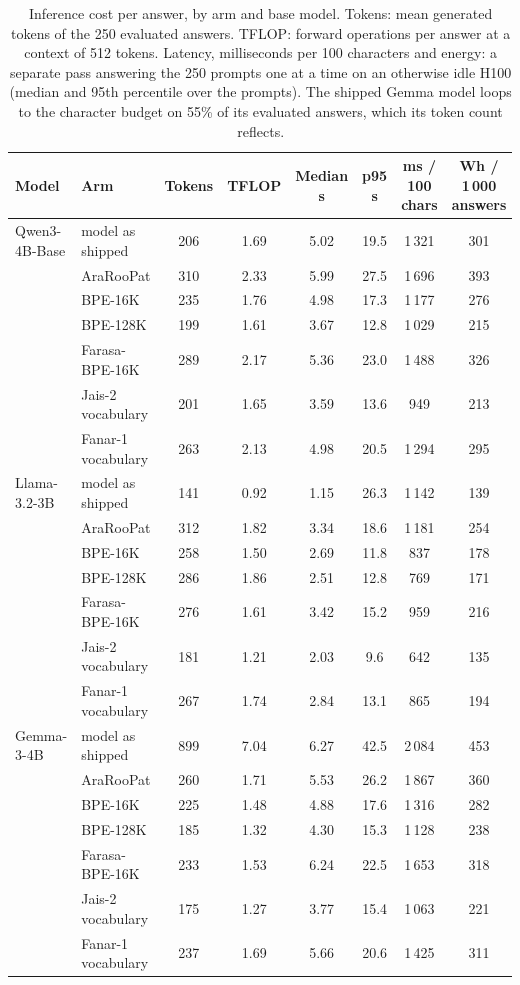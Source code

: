 \documentclass[a4paper,fleqn]{cas-sc}
\begin{document}
\begin{table}[t]
\centering
\caption{Inference cost per answer, by arm and base model. Tokens: mean generated tokens of the 250 evaluated answers. TFLOP: forward operations per answer at a context of 512 tokens. Latency, milliseconds per 100 characters and energy: a separate pass answering the 250 prompts one at a time on an otherwise idle H100 (median and 95th percentile over the prompts). The shipped Gemma model loops to the character budget on 55\% of its evaluated answers, which its token count reflects.}
\label{tab:cost}
\small
\begin{tabular}{@{}llcccccc@{}}
\toprule
Model & Arm & Tokens & TFLOP & Median s & p95 s & ms / 100 chars & Wh / 1\,000 answers \\
\midrule
Qwen3-4B-Base & model as shipped & 206 & 1.69 & 5.02 & 19.5 & 1\,321 & 301 \\
 & AraRooPat & 310 & 2.33 & 5.99 & 27.5 & 1\,696 & 393 \\
 & BPE-16K & 235 & 1.76 & 4.98 & 17.3 & 1\,177 & 276 \\
 & BPE-128K & 199 & 1.61 & 3.67 & 12.8 & 1\,029 & 215 \\
 & Farasa-BPE-16K & 289 & 2.17 & 5.36 & 23.0 & 1\,488 & 326 \\
 & Jais-2 vocabulary & 201 & 1.65 & 3.59 & 13.6 & 949 & 213 \\
 & Fanar-1 vocabulary & 263 & 2.13 & 4.98 & 20.5 & 1\,294 & 295 \\
\midrule
Llama-3.2-3B & model as shipped & 141 & 0.92 & 1.15 & 26.3 & 1\,142 & 139 \\
 & AraRooPat & 312 & 1.82 & 3.34 & 18.6 & 1\,181 & 254 \\
 & BPE-16K & 258 & 1.50 & 2.69 & 11.8 & 837 & 178 \\
 & BPE-128K & 286 & 1.86 & 2.51 & 12.8 & 769 & 171 \\
 & Farasa-BPE-16K & 276 & 1.61 & 3.42 & 15.2 & 959 & 216 \\
 & Jais-2 vocabulary & 181 & 1.21 & 2.03 & 9.6 & 642 & 135 \\
 & Fanar-1 vocabulary & 267 & 1.74 & 2.84 & 13.1 & 865 & 194 \\
\midrule
Gemma-3-4B & model as shipped & 899 & 7.04 & 6.27 & 42.5 & 2\,084 & 453 \\
 & AraRooPat & 260 & 1.71 & 5.53 & 26.2 & 1\,867 & 360 \\
 & BPE-16K & 225 & 1.48 & 4.88 & 17.6 & 1\,316 & 282 \\
 & BPE-128K & 185 & 1.32 & 4.30 & 15.3 & 1\,128 & 238 \\
 & Farasa-BPE-16K & 233 & 1.53 & 6.24 & 22.5 & 1\,653 & 318 \\
 & Jais-2 vocabulary & 175 & 1.27 & 3.77 & 15.4 & 1\,063 & 221 \\
 & Fanar-1 vocabulary & 237 & 1.69 & 5.66 & 20.6 & 1\,425 & 311 \\
\bottomrule
\end{tabular}
\end{table}
\end{document}
